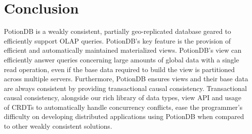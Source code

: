 \documentclass[sigplan,10pt]{acmart}
\begin{document}
% 
%

\section{Conclusion}
\label{sec:conclusion}

PotionDB is a weakly consistent, partially geo-replicated database geared to efficiently support OLAP queries.
PotionDB’s key feature is the provision of efficient and automatically maintained materialized views.
PotionDB’s view can efficiently answer queries concerning large amounts of global data with a single read operation, even if the base data required to build the view is partitioned across multiple servers.
Furthermore, PotionDB ensures views and their base data are always consistent by providing transactional causal consistency.
Transactional causal consistency, alongside our rich library of data types, view API and usage of CRDTs to automatically handle concurrency conflicts, ease the programmer’s difficulty on developing distributed applications using PotionDB when compared to other weakly consistent solutions.
\end{document}
